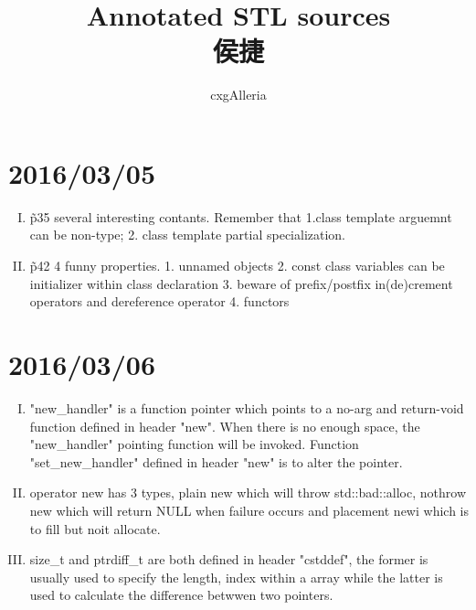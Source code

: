 \documentclass{ctexart}
\begin{document}
\title{%
	Annotated STL sources\\
		侯捷
}
\author{%
	cxgAlleria
}
\maketitle

\tableofcontents
\section[0305]{2016/03/05}
	\begin{enumerate}[I.]
		\item \~ p35 several interesting contants. Remember that 1.class template arguemnt can be non-type; 2. class template partial specialization.
		\item \~ p42 4 funny properties. 1. unnamed objects 2. const class variables can be initializer within class declaration 3. beware of prefix/postfix in(de)crement operators and dereference operator 4. functors
	\end{enumerate}
	
\section[0306]{2016/03/06}
	\begin{enumerate}[I.]
		\item "new\_handler" is a function pointer which points to a no-arg and return-void function defined in header "new". When there is no enough space, the "new\_handler" pointing function will be invoked. Function "set\_new\_handler" defined in header "new" is to alter the pointer.
		\item operator new has 3 types, plain new which will throw std::bad::alloc, nothrow new which will return NULL when failure occurs and placement newi which is to fill but noit allocate. 
		\item size\_t and ptrdiff\_t are both defined in header "cstddef", the former is usually used to specify the length, index within a array while the latter is used to calculate the difference betwwen two pointers. 
	\end{enumerate}
\end{document}
